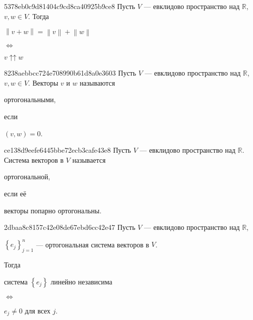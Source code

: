 \begin{note}{5378eb0c9d81404c9cd8ca40925b9ce8}
    Пусть \({ V }\) --- евклидово пространство над \({ \mathbb R }\),\: \({ v, w \in V }\).
    Тогда
    \begin{center}
        \({ \left\lVert v + w \right\rVert = \left\lVert v \right\rVert + \left\lVert w \right\rVert }\)
        \begin{icloze}{2}\({ \iff }\) \end{icloze}
        \begin{icloze}{1}\({ v \operatorname{\uparrow\uparrow} w }\)\end{icloze}
    \end{center}
\end{note}

\begin{note}{8238aebbcc724e708990b61d8a0e3603}
    Пусть \({ V }\) --- евклидово пространство над \({ \mathbb R }\),\: \({ v, w \in V }\).
    Векторы \({ v }\) и \({ w }\) называются \begin{icloze}{2}ортогональными,\end{icloze} если \begin{icloze}{1}\({ (v, w) = 0 }\).\end{icloze}
\end{note}

\begin{note}{ce138d9eefe6445bbe72ecb3cafe43e8}
    Пусть \({ V }\) --- евклидово пространство над \({ \mathbb R }\).
    Система векторов в \({ V }\) называется \begin{icloze}{2}ортогональной,\end{icloze} если её \begin{icloze}{1}векторы попарно ортогональны.\end{icloze}
\end{note}

\begin{note}{2dbaa8c8157c42e08de67ebd6cc42e47}
    Пусть \({ V }\) --- евклидово пространство над \({ \mathbb R }\),\: \begin{icloze}{4}\({ \left\{ e_j \right\}_{j = 1}^{n} }\) --- ортогональная система векторов в \({ V }\).\end{icloze}
    Тогда \begin{icloze}{3}система \({ \left\{ e_j \right\} }\) линейно независима\end{icloze} \begin{icloze}{2}\({ \iff }\)\end{icloze} \begin{icloze}{1}\({ e_j \neq 0 }\) для всех \({ j }\).\end{icloze}
\end{note}

